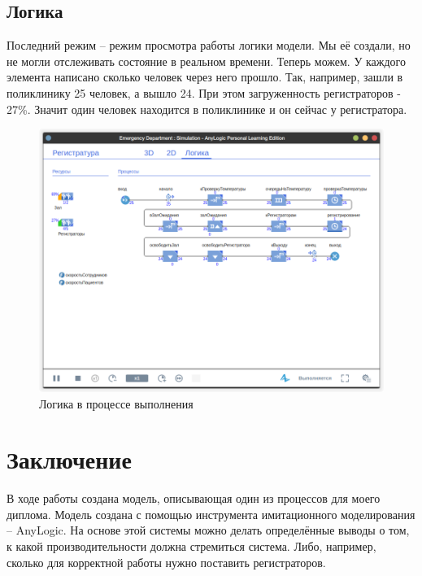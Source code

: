 \documentclass[a4paper, article]{article}
\begin{document}
    \subsection{Логика}

    Последний режим -- режим просмотра работы логики модели. Мы её создали, но не могли отслеживать состояние в реальном времени. Теперь можем. У каждого элемента написано сколько человек через него прошло. Так, например, зашли в поликлинику 25 человек, а вышло 24. При этом загруженность регистраторов - 27\%. Значит один человек находится в поликлинике и он сейчас у регистратора.

    \begin{figure}[h]
        \centering
        \includegraphics[width=0.7\linewidth]{pageLogic.png}
        \caption{\centering Логика в процессе выполнения}
        \label{fig:pageLogic}
    \end{figure}

    \pagebreak

    \section*{Заключение}

    В ходе работы создана модель, описывающая один из процессов для моего диплома. Модель создана с помощью инструмента имитационного моделирования -- AnyLogic. На основе этой системы можно делать определённые выводы о том, к какой производительности должна стремиться система. Либо, например, сколько для корректной работы нужно поставить регистраторов.
\end{document}
